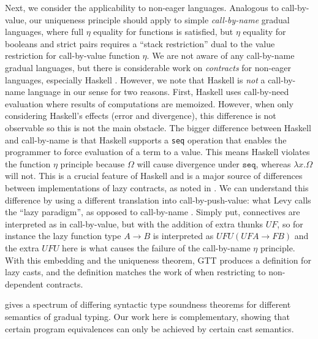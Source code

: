 \documentclass[acmsmall,nonacm]{acmart}
\newif\iflong
\newcommand{\seq}{\texttt{seq}}
\begin{document}
{Next, we consider the applicability to non-eager languages.
%
Analogous to call-by-value, our uniqueness principle should apply to
simple \emph{call-by-name} gradual languages, where full $\eta$
equality for functions is satisfied, but $\eta$ equality for booleans
and strict pairs requires a ``stack restriction'' dual to the value
restriction for call-by-value function $\eta$.
%
We are not aware of any call-by-name gradual languages, but there is
considerable work on \emph{contracts} for non-eager languages,
especially Haskell \cite{hinzeJeuringLoh06,XuPJC09}.
%
However, we note that Haskell is \emph{not} a call-by-name language in
our sense for two reasons.
%
First, Haskell uses call-by-need evaluation where results of
computations are memoized. However, when only considering Haskell's
effects (error and divergence), this difference is not observable so
this is not the main obstacle.
%
The bigger difference between Haskell and call-by-name is that Haskell
supports a \texttt{seq} operation that enables the programmer to force
evaluation of a term to a value.
%
This means Haskell violates the function $\eta$ principle because
$\Omega$ will cause divergence under $\seq$, whereas $\lambda
x. \Omega$ will not.
%
This is a crucial feature of Haskell and is a major source of
differences between implementations of lazy contracts, as noted in
\citet{Degen2012TheIO}.
%
We can understand this difference by using a different translation
into call-by-push-value: what Levy calls the ``lazy paradigm'', as
opposed to call-by-name \cite{levy03cbpvbook}.
%
Simply put, connectives are interpreted as in call-by-value, but with
the addition of extra thunks $UF$, so for instance the lazy function
type $A \to B$ is interpreted as $UFU(UFA \to FB)$ and the extra $UFU$
here is what causes the failure of the call-by-name $\eta$ principle.
%
With this embedding and the uniqueness theorem, GTT produces a
definition for lazy casts, and the definition matches the work of
\citet{XuPJC09} when restricting to non-dependent contracts.

\iflong\paragraph{Comparing Soundness Principles for Cast Semantics}\fi
\citet{greenmanfelleisen:2018} gives a spectrum of
differing syntactic type soundness theorems for different semantics of
gradual typing.
%
Our work here is complementary, showing that certain program
equivalences can only be achieved by certain cast semantics.

}
\end{document}
